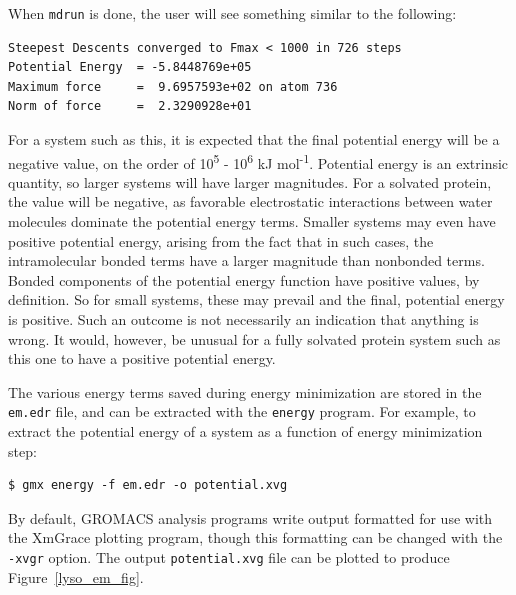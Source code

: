 \documentclass[9pt,tutorial,pubversion]{livecoms}
\begin{document}
When \texttt{mdrun} is done, the user will see something similar to the following:

\begin{lstlisting}[basicstyle=\footnotesize\ttfamily]
Steepest Descents converged to Fmax < 1000 in 726 steps
Potential Energy  = -5.8448769e+05
Maximum force     =  9.6957593e+02 on atom 736
Norm of force     =  2.3290928e+01
\end{lstlisting}

For a system such as this, it is expected that the final potential energy will be a negative value, on the order of 10\textsuperscript{5} - 10\textsuperscript{6} kJ mol\textsuperscript{-1}. Potential energy is an extrinsic quantity, so larger systems will have larger magnitudes. For a solvated protein, the value will be negative, as favorable electrostatic interactions between water molecules dominate the potential energy terms. Smaller systems may even have positive potential energy, arising from the fact that in such cases, the intramolecular bonded terms have a larger magnitude than nonbonded terms. Bonded components of the potential energy function have positive values, by definition. So for small systems, these may prevail and the final, potential energy is positive. Such an outcome is not necessarily an indication that anything is wrong. It would, however, be unusual for a fully solvated protein system such as this one to have a positive potential energy.

The various energy terms saved during energy minimization are stored in the \texttt{em.edr} file, and can be extracted with the \texttt{energy} program. For example, to extract the potential energy of a system as a function of energy minimization step:

\begin{lstlisting}
$ gmx energy -f em.edr -o potential.xvg
\end{lstlisting}

By default, GROMACS analysis programs write output formatted for use with the XmGrace plotting program, though this formatting can be changed with the \texttt{-xvgr} option. The output \texttt{potential.xvg} file can be plotted to produce Figure~\ref{lyso_em_fig}.
\end{document}
